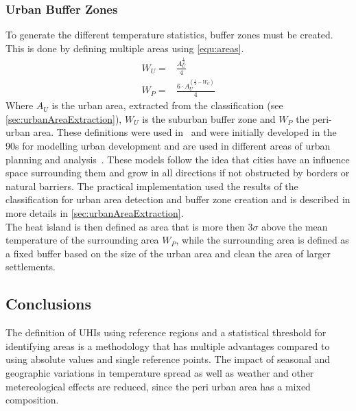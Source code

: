 \documentclass[12pt,a4paper, english,twoside]{scrartcl}
\begin{document}
    \subsubsection{Urban Buffer Zones}\label{sec:urbanBufferzone}
      To generate the different temperature statistics, buffer zones must be created.
      This is done by defining multiple areas using \cref{equ:areas}.
      \begin{equation}\label{equ:areas}
        \begin{split}
          W_U = & \frac{A_U^{\frac{1}{2}}}{4} \\
          W_P = & \frac{6\cdot A_U^{(\frac{1}{2}-W_U)}}{4}
        \end{split}
      \end{equation}
      Where $A_U$ is the urban area, extracted from the classification (see \cref{sec:urbanAreaExtraction}), $W_U$ is the suburban buffer zone and $W_P$ the peri-urban area.
      These definitions were used in~\cite{Sobrino2020} and were initially developed in the 90s for modelling urban development and are used in different areas of urban planning and analysis~\autocite[see]{AlkanBala2014}.
      These models follow the idea that cities have an influence space surrounding them and grow in all directions if not obstructed by borders or natural barriers. 
      The practical implementation used the results of the classification for urban area detection and buffer zone creation and is described in more details in \cref{sec:urbanAreaExtraction}. \\
      The heat island is then defined as area that is more then $3\sigma$ above the mean temperature of the surrounding area $W_P$, while the surrounding area is defined as a fixed buffer based on the size of the urban area and clean the area of larger settlements. 
    \subsection{Conclusions}
    The definition of \glspl{UHI} using reference regions and a statistical threshold for identifying areas is a methodology that has multiple advantages compared to using absolute values and single reference points. 
    The impact of seasonal and geographic variations in temperature spread as well as weather and other metereological effects are reduced, since the peri urban area has a mixed composition. 

\newpage
\end{document}
